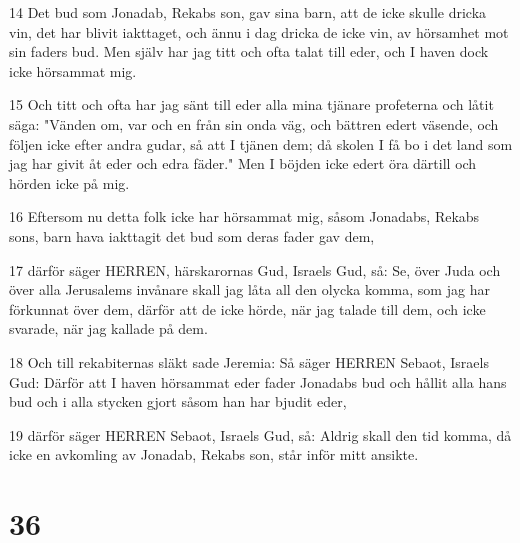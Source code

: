 \par 14 Det bud som Jonadab, Rekabs son, gav sina barn, att de icke skulle dricka vin, det har blivit iakttaget, och ännu i dag dricka de icke vin, av hörsamhet mot sin faders bud. Men själv har jag titt och ofta talat till eder, och I haven dock icke hörsammat mig.
\par 15 Och titt och ofta har jag sänt till eder alla mina tjänare profeterna och låtit säga: "Vänden om, var och en från sin onda väg, och bättren edert väsende, och följen icke efter andra gudar, så att I tjänen dem; då skolen I få bo i det land som jag har givit åt eder och edra fäder." Men I böjden icke edert öra därtill och hörden icke på mig.
\par 16 Eftersom nu detta folk icke har hörsammat mig, såsom Jonadabs, Rekabs sons, barn hava iakttagit det bud som deras fader gav dem,
\par 17 därför säger HERREN, härskarornas Gud, Israels Gud, så: Se, över Juda och över alla Jerusalems invånare skall jag låta all den olycka komma, som jag har förkunnat över dem, därför att de icke hörde, när jag talade till dem, och icke svarade, när jag kallade på dem.
\par 18 Och till rekabiternas släkt sade Jeremia: Så säger HERREN Sebaot, Israels Gud: Därför att I haven hörsammat eder fader Jonadabs bud och hållit alla hans bud och i alla stycken gjort såsom han har bjudit eder,
\par 19 därför säger HERREN Sebaot, Israels Gud, så: Aldrig skall den tid komma, då icke en avkomling av Jonadab, Rekabs son, står inför mitt ansikte.

\chapter{36}

